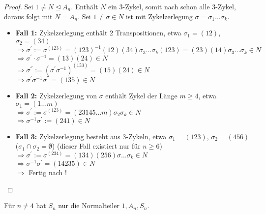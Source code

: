 \begin{proof}
	Sei $1 \neq N \unlhd A_n$. Enthält $N$ ein $3$-Zykel, somit nach  schon alle $3$-Zykel, daraus folgt mit  $N = A_n$. Sei $1 \neq \sigma \in N$ ist mit Zykelzerlegung $\sigma = \sigma_1\dots \sigma_k$.
	\begin{itemize}
		\item \textbf{Fall 1:} Zykelzerlegung enthält 2 Transpositionen, etwa $\sigma_1 = (12)$, $\sigma_2 = (34)$\\
		$\Rightarrow \sigma^{'} := \sigma^{(123)} = (123)^{-1}(12)(34)\sigma_3\dots\sigma_k(123) = (23)(14)\sigma_3\dots\sigma_k \in N$\\
		$\Rightarrow \sigma^{'}\cdot\sigma^{-1} = (13)(24) \in N$\\
		$\Rightarrow \sigma^{''} := (\sigma^{'}\sigma^{-1})^{(153)} = (15)(24) \in N$\\
		$\Rightarrow \sigma^{'}\sigma^{-1}\sigma^{''} = (135) \in N$
		\item \textbf{Fall 2:} Zykelzerlegung von $\sigma$ enthält Zykel der Länge $m \geq 4$, etwa $\sigma_1 = (1\dots m)$\\
		$\Rightarrow \sigma^{'}:=\sigma^{(123)} = (23145\dots m)\sigma_2\sigma_k \in N$\\
		$\Rightarrow \sigma^{-1}\sigma^{'} :=(241)\in N$
		\item \textbf{Fall 3:} Zykelzerlegung besteht aus $3$-Zykeln, etwa $\sigma_1 = (123)$, $\sigma_2=(456)$ ($\sigma_1 \cap \sigma_2 = \emptyset$) (dieser Fall existiert nur für $n \geq 6$)\\
		$\Rightarrow \sigma^{'} := \sigma^{(234)} = (134)(256)\sigma\dots\sigma_k \in N$\\
		$\Rightarrow \sigma^{-1}\sigma^{'} = (14235) \in N$\\
		$\Rightarrow$ Fertig nach !
	\end{itemize} 
\end{proof}

\begin{conclusion}
	Für $n\neq 4$ hat $S_n$ nur die Normalteiler $1,A_n,S_n$.
\end{conclusion}

